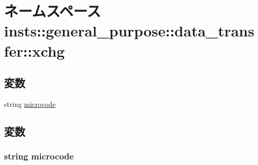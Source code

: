 \hypertarget{namespaceinsts_1_1general__purpose_1_1data__transfer_1_1xchg}{
\section{ネームスペース insts::general\_\-purpose::data\_\-transfer::xchg}
\label{namespaceinsts_1_1general__purpose_1_1data__transfer_1_1xchg}
}
\subsection*{変数}
\begin{DoxyCompactItemize}
\item 
string \hyperlink{namespaceinsts_1_1general__purpose_1_1data__transfer_1_1xchg_a770f11a173e99389a8802f0107ed8f52}{microcode}
\end{DoxyCompactItemize}


\subsection{変数}
\hypertarget{namespaceinsts_1_1general__purpose_1_1data__transfer_1_1xchg_a770f11a173e99389a8802f0107ed8f52}{
\subsubsection[{microcode}]{\setlength{\rightskip}{0pt plus 5cm}string {\bf microcode}}}
\label{namespaceinsts_1_1general__purpose_1_1data__transfer_1_1xchg_a770f11a173e99389a8802f0107ed8f52}
